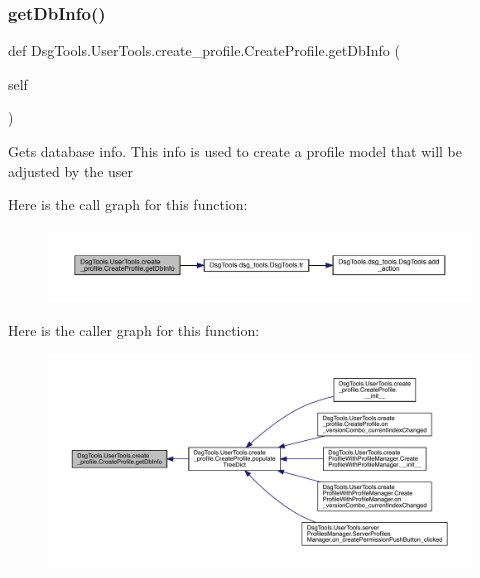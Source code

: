 \subsubsection{\texorpdfstring{get\+Db\+Info()}{getDbInfo()}}
{\footnotesize\ttfamily def Dsg\+Tools.\+User\+Tools.\+create\+\_\+profile.\+Create\+Profile.\+get\+Db\+Info (\begin{DoxyParamCaption}\item[{}]{self }\end{DoxyParamCaption})}

\begin{DoxyVerb}Gets database info. This info is used to create a profile model that will be adjusted by the user
\end{DoxyVerb}
 Here is the call graph for this function\+:
\nopagebreak
\begin{figure}[H]
\begin{center}
\leavevmode
\includegraphics[width=350pt]{class_dsg_tools_1_1_user_tools_1_1create__profile_1_1_create_profile_a0d623cfe805e672e761f61036f9f258c_cgraph}
\end{center}
\end{figure}
Here is the caller graph for this function\+:
\nopagebreak
\begin{figure}[H]
\begin{center}
\leavevmode
\includegraphics[width=350pt]{class_dsg_tools_1_1_user_tools_1_1create__profile_1_1_create_profile_a0d623cfe805e672e761f61036f9f258c_icgraph}
\end{center}
\end{figure}
\mbox{\label{class_dsg_tools_1_1_user_tools_1_1create__profile_1_1_create_profile_a11888e6ef97f1c8acf95e216cb19c28d}} 
